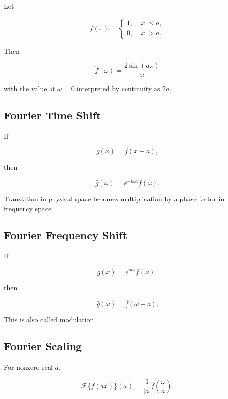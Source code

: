 Let

\[
f(x)
=
\begin{cases}
1, & |x|\leq a,\\
0, & |x|>a.
\end{cases}
\]

Then

\[
\boxed{
\widehat f(\omega)
=
\frac{
2\sin(a\omega)
}{
\omega
}
}
\]

with the value at \(\omega=0\) interpreted by continuity as \(2a\).

\subsection{Fourier Time Shift}
\label{subsec:fourier-time-shift}

If

\[
g(x)=f(x-a),
\]

then

\[
\boxed{
\widehat g(\omega)
=
e^{-i\omega a}
\widehat f(\omega).
}
\]

Translation in physical space becomes multiplication by a phase factor in
frequency space.

\subsection{Fourier Frequency Shift}
\label{subsec:fourier-frequency-shift}

If

\[
g(x)
=
e^{iax}f(x),
\]

then

\[
\boxed{
\widehat g(\omega)
=
\widehat f(\omega-a).
}
\]

This is also called modulation.

\subsection{Fourier Scaling}
\label{subsec:fourier-scaling}

For nonzero real \(a\),

\[
\boxed{
\mathcal{F}
\{
f(ax)
\}
(\omega)
=
\frac1{|a|}
\widehat f
\left(
\frac{\omega}{a}
\right).
}
\]


